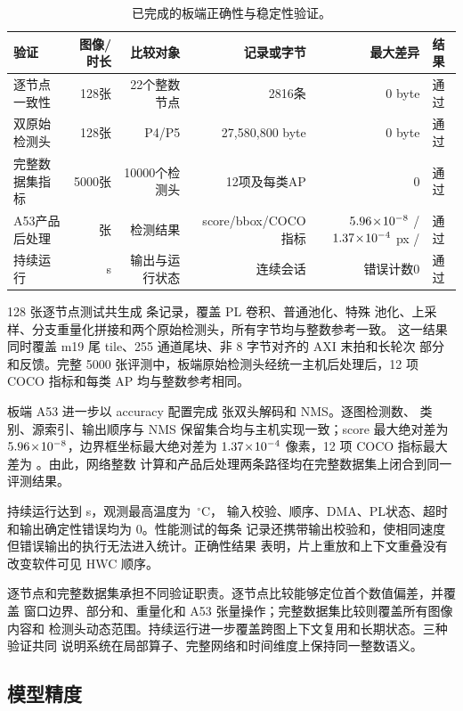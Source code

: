 \begin{table}[t]
\centering
\caption{已完成的板端正确性与稳定性验证。}
\label{tab:academic-correctness}
\small
\setlength{\tabcolsep}{5pt}
\begin{tabular}{lrrrrl}
\toprule
验证 & 图像/时长 & 比较对象 & 记录或字节 & 最大差异 & 结果 \\
\midrule
逐节点一致性 & 128张 & 22个整数节点 & 2816条 & 0 byte & 通过 \\
双原始检测头 & 128张 & P4/P5 & 27,580,800 byte & 0 byte & 通过 \\
完整数据集指标 & 5000张 & 10000个检测头 & 12项及每类AP & 0 & 通过 \\
A53产品后处理 & \ProductImages{}张 & 检测结果 & score/bbox/COCO指标 & $5.96\!\times\!10^{-8}$ / $1.37\!\times\!10^{-4}$ px / \ProductMetricDelta{} & 通过 \\
持续运行 & \SoakSeconds{} s & 输出与运行状态 & 连续会话 & 错误计数0 & 通过 \\
\bottomrule
\end{tabular}
\end{table}

128 张逐节点测试共生成 \NodeRecords{} 条记录，覆盖 PL 卷积、普通池化、特殊
池化、上采样、分支重量化拼接和两个原始检测头，所有字节均与整数参考一致。
这一结果同时覆盖 m19 尾 tile、255 通道尾块、非 8 字节对齐的 AXI 末拍和长轮次
部分和反馈。完整 5000 张评测中，板端原始检测头经统一主机后处理后，12 项
COCO 指标和每类 AP 均与整数参考相同。

板端 A53 进一步以 accuracy 配置完成 \ProductImages{} 张双头解码和 NMS。逐图检测数、
类别、源索引、输出顺序与 NMS 保留集合均与主机实现一致；score 最大绝对差为
$5.96\!\times\!10^{-8}$，边界框坐标最大绝对差为
$1.37\!\times\!10^{-4}$ 像素，12 项 COCO 指标最大差为 \ProductMetricDelta{}。由此，网络整数
计算和产品后处理两条路径均在完整数据集上闭合到同一评测结果。

持续运行达到 \SoakSeconds{} s，观测最高温度为 \SoakTempC{}\,$^{\circ}$C，
输入校验、顺序、DMA、PL状态、超时和输出确定性错误均为 0。性能测试的每条
记录还携带输出校验和，使相同速度但错误输出的执行无法进入统计。正确性结果
表明，片上重放和上下文重叠没有改变软件可见 HWC 顺序。

逐节点和完整数据集承担不同验证职责。逐节点比较能够定位首个数值偏差，并覆盖
窗口边界、部分和、重量化和 A53 张量操作；完整数据集比较则覆盖所有图像内容和
检测头动态范围。持续运行进一步覆盖跨图上下文复用和长期状态。三种验证共同
说明系统在局部算子、完整网络和时间维度上保持同一整数语义。

\subsection{模型精度}

